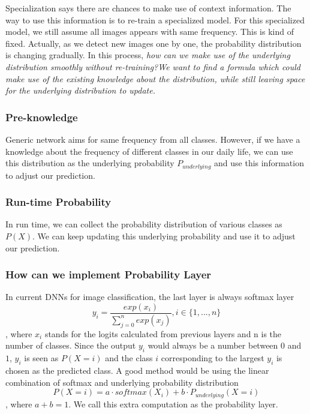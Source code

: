 \documentclass{article}
\begin{document}
Specialization says there are chances to make use of context information. The way to use this information is to re-train a specialized model. For this specialized model, we still assume all images appears with same frequency. This is kind of fixed. Actually, as we detect new images one by one, the probability distribution is changing gradually. In this process, \textit{how can we make use of the underlying distribution smoothly without re-training?}\textit{We want to find a formula which could make use of the existing knowledge about the distribution, while still leaving space for the underlying distribution to update.}

\subsubsection{Pre-knowledge}
Generic network aims for same frequency from all classes. However, if we have a knowledge about the frequency of different classes in our daily life, we can use this distribution as the underlying probability $P_{underlying}$ and use this information to adjust our prediction.


\subsubsection{Run-time Probability}
In run time, we can collect the probability distribution of various classes as $P(X)$. We can keep updating this underlying probability and use it to adjust our prediction.

\subsubsection{How can we implement Probability Layer}
In current DNNs for image classification, the last layer is always softmax layer
\begin{equation}
    y_i = \frac{exp(x_i)}{\sum_{j = 0}^{n}exp(x_j)}, i \in \{1,...,n\}
\end{equation} , where $x_i$ stands for the logits calculated from previous layers and n is the number of classes. Since the output $y_i$ would always be a number between $0$ and $1$, $y_i$ is seen as $P(X = i)$ and the class $i$ corresponding to the largest $y_i$ is chosen as the predicted class. A good method would be using the linear combination of softmax and underlying probability distribution 
\begin{equation}
P(X = i) = a \cdot softmax(X_i) + b \cdot P_{underlying}(X = i)    
\end{equation}
, where $a+b = 1$. We call this extra computation as the probability layer.
\end{document}
